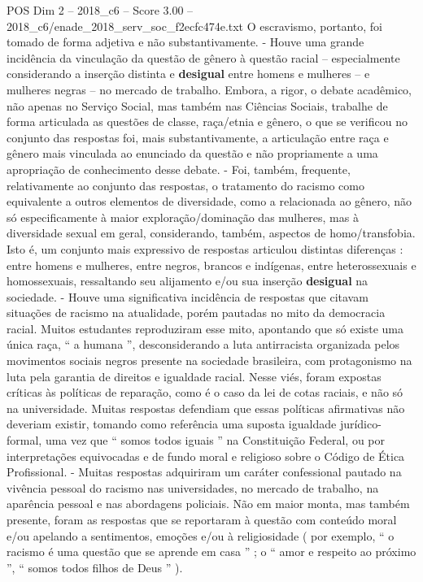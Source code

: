 \begin{textsample}{POS Dim 2 – 2018\_c6 – Score 3.00 – 2018\_c6/enade\_2018\_serv\_soc\_f2ecfc474e.txt}
O escravismo, portanto, foi tomado de forma adjetiva e não substantivamente. - Houve uma grande incidência da vinculação da questão de gênero à questão racial – especialmente considerando a inserção distinta e \textbf{desigual} entre homens e mulheres – e mulheres negras – no mercado de trabalho.
Embora, a rigor, o debate acadêmico, não apenas no Serviço Social, mas também nas Ciências Sociais, trabalhe de forma articulada as questões de classe, raça/etnia e gênero, o que se verificou no conjunto das respostas foi, mais substantivamente, a articulação entre raça e gênero mais vinculada ao enunciado da questão e não propriamente a uma apropriação de conhecimento desse debate. - Foi, também, frequente, relativamente ao conjunto das respostas, o tratamento do racismo como equivalente a outros elementos de diversidade, como a relacionada ao gênero, não só especificamente à maior exploração/dominação das mulheres, mas à diversidade sexual em geral, considerando, também, aspectos de homo/transfobia.
Isto é, um conjunto mais expressivo de respostas articulou distintas diferenças : entre homens e mulheres, entre negros, brancos e indígenas, entre heterossexuais e homossexuais, ressaltando seu alijamento e/ou sua inserção \textbf{desigual} na sociedade. - Houve uma significativa incidência de respostas que citavam situações de racismo na atualidade, porém pautadas no mito da democracia racial.
Muitos estudantes reproduziram esse mito, apontando que só existe uma única raça, “ a humana ”, desconsiderando a luta antirracista organizada pelos movimentos sociais negros presente na sociedade brasileira, com protagonismo na luta pela garantia de direitos e igualdade racial.
Nesse viés, foram expostas críticas às políticas de reparação, como é o caso da lei de cotas raciais, e não só na universidade.
Muitas respostas defendiam que essas políticas afirmativas não deveriam existir, tomando como referência uma suposta igualdade jurídico-formal, uma vez que “ somos todos iguais ” na Constituição Federal, ou por interpretações equivocadas e de fundo moral e religioso sobre o Código de Ética Profissional. - Muitas respostas adquiriram um caráter confessional pautado na vivência pessoal do racismo nas universidades, no mercado de trabalho, na aparência pessoal e nas abordagens policiais.
Não em maior monta, mas também presente, foram as respostas que se reportaram à questão com conteúdo moral e/ou apelando a sentimentos, emoções e/ou à religiosidade ( por exemplo, “ o racismo é uma questão que se aprende em casa ” ; o “ amor e respeito ao próximo ”, “ somos todos filhos de Deus ” ).

\end{textsample}
